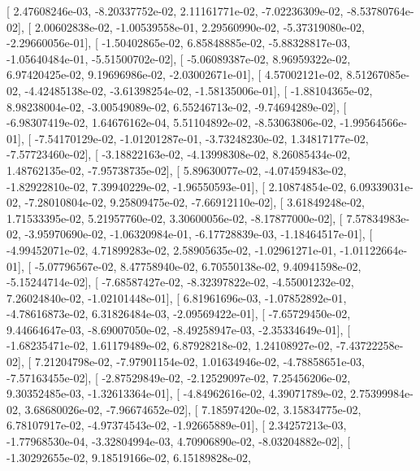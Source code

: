 \documentclass{article}
\begin{document}
       [  2.47608246e-03,  -8.20337752e-02,   2.11161771e-02,
         -7.02236309e-02,  -8.53780764e-02],
       [  2.00602838e-02,  -1.00539558e-01,   2.29560990e-02,
         -5.37319080e-02,  -2.29660056e-01],
       [ -1.50402865e-02,   6.85848885e-02,  -5.88328817e-03,
         -1.05640484e-01,  -5.51500702e-02],
       [ -5.06089387e-02,   8.96959322e-02,   6.97420425e-02,
          9.19696986e-02,  -2.03002671e-01],
       [  4.57002121e-02,   8.51267085e-02,  -4.42485138e-02,
         -3.61398254e-02,  -1.58135006e-01],
       [ -1.88104365e-02,   8.98238004e-02,  -3.00549089e-02,
          6.55246713e-02,  -9.74694289e-02],
       [ -6.98307419e-02,   1.64676162e-04,   5.51104892e-02,
         -8.53063806e-02,  -1.99564566e-01],
       [ -7.54170129e-02,  -1.01201287e-01,  -3.73248230e-02,
          1.34817177e-02,  -7.57723460e-02],
       [ -3.18822163e-02,  -4.13998308e-02,   8.26085434e-02,
          1.48762135e-02,  -7.95738735e-02],
       [  5.89630077e-02,  -4.07459483e-02,  -1.82922810e-02,
          7.39940229e-02,  -1.96550593e-01],
       [  2.10874854e-02,   6.09339031e-02,  -7.28010804e-02,
          9.25809475e-02,  -7.66912110e-02],
       [  3.61849248e-02,   1.71533395e-02,   5.21957760e-02,
          3.30600056e-02,  -8.17877000e-02],
       [  7.57834983e-02,  -3.95970690e-02,  -1.06320984e-01,
         -6.17728839e-03,  -1.18464517e-01],
       [ -4.99452071e-02,   4.71899283e-02,   2.58905635e-02,
         -1.02961271e-01,  -1.01122664e-01],
       [ -5.07796567e-02,   8.47758940e-02,   6.70550138e-02,
          9.40941598e-02,  -5.15244714e-02],
       [ -7.68587427e-02,  -8.32397822e-02,  -4.55001232e-02,
          7.26024840e-02,  -1.02101448e-01],
       [  6.81961696e-03,  -1.07852892e-01,  -4.78616873e-02,
          6.31826484e-03,  -2.09569422e-01],
       [ -7.65729450e-02,   9.44664647e-03,  -8.69007050e-02,
         -8.49258947e-03,  -2.35334649e-01],
       [ -1.68235471e-02,   1.61179489e-02,   6.87928218e-02,
          1.24108927e-02,  -7.43722258e-02],
       [  7.21204798e-02,  -7.97901154e-02,   1.01634946e-02,
         -4.78858651e-03,  -7.57163455e-02],
       [ -2.87529849e-02,  -2.12529097e-02,   7.25456206e-02,
          9.30352485e-03,  -1.32613364e-01],
       [ -4.84962616e-02,   4.39071789e-02,   2.75399984e-02,
          3.68680026e-02,  -7.96674652e-02],
       [  7.18597420e-02,   3.15834775e-02,   6.78107917e-02,
         -4.97374543e-02,  -1.92665889e-01],
       [  2.34257213e-03,  -1.77968530e-04,  -3.32804994e-03,
          4.70906890e-02,  -8.03204882e-02],
       [ -1.30292655e-02,   9.18519166e-02,   6.15189828e-02,
\end{document}
